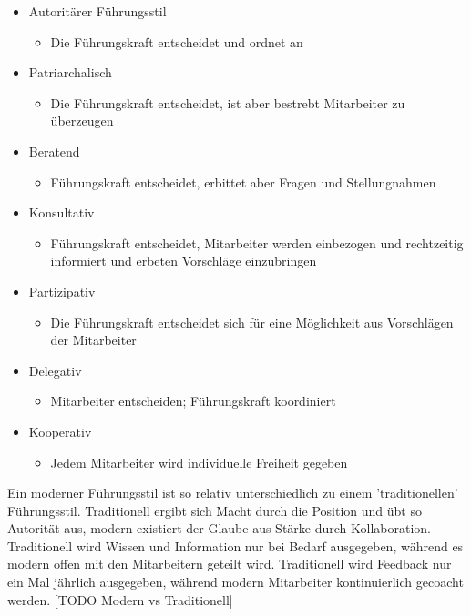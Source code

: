 \documentclass{article}
\begin{document}
	 \begin{itemize}
	 	\item{Autoritärer Führungsstil}
	 	\begin{itemize}
	 		\item{Die Führungskraft entscheidet und ordnet an}
	 	\end{itemize}
	 	\item{Patriarchalisch}
	 	\begin{itemize}
	 		\item{Die Führungskraft entscheidet, ist aber bestrebt Mitarbeiter zu überzeugen}
	 	\end{itemize}
	 	\item{Beratend}
	 	\begin{itemize}
	 		\item{Führungskraft entscheidet, erbittet aber Fragen und Stellungnahmen}
	 	\end{itemize}
	 	\item{Konsultativ}
	 	\begin{itemize}
	 		\item{Führungskraft entscheidet, Mitarbeiter werden einbezogen und rechtzeitig informiert und erbeten Vorschläge einzubringen}
	 	\end{itemize}
	 	\item{Partizipativ}
	 	\begin{itemize}
	 		\item{Die Führungskraft entscheidet sich für eine Möglichkeit aus Vorschlägen der Mitarbeiter}
	 	\end{itemize}
	 	\item{Delegativ}
	 	\begin{itemize}
	 		\item{Mitarbeiter entscheiden; Führungskraft koordiniert}
	 	\end{itemize}
	 	\item{Kooperativ}
	 	\begin{itemize}
	 		\item{Jedem Mitarbeiter wird individuelle Freiheit gegeben}
	 	\end{itemize}
	 \end{itemize}
	 Ein moderner Führungsstil ist so relativ unterschiedlich zu einem 'traditionellen' Führungsstil. Traditionell ergibt sich Macht durch die Position und übt so Autorität aus, modern existiert der Glaube aus Stärke durch Kollaboration. Traditionell wird Wissen und Information nur bei Bedarf ausgegeben, während es modern offen mit den Mitarbeitern geteilt wird. Traditionell wird Feedback nur ein Mal jährlich ausgegeben, während modern Mitarbeiter kontinuierlich gecoacht werden. [TODO Modern vs Traditionell]
\end{document}
